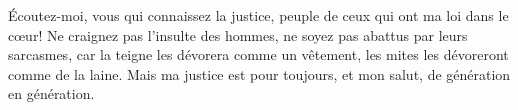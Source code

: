 Écoutez-moi, vous qui connaissez la justice,
	peuple de ceux qui ont ma loi dans le cœur!
Ne craignez pas l’insulte des hommes, ne soyez pas abattus par leurs sarcasmes,
	car la teigne les dévorera comme un vêtement,
	les mites les dévoreront comme de la laine.
Mais ma justice est pour toujours,
	et mon salut, de génération en génération.
